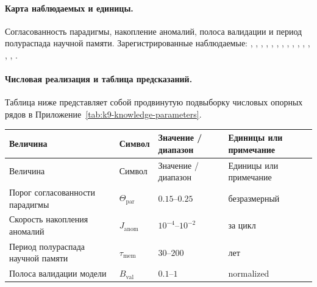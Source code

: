 \paragraph{Карта наблюдаемых и единицы.}
Согласованность парадигмы, накопление аномалий, полоса валидации и период полураспада научной памяти.
Зарегистрированные наблюдаемые: , \allowbreak {}, \allowbreak {}, \allowbreak {}, \allowbreak {}, \allowbreak {}, \allowbreak {}, \allowbreak {}, \allowbreak {}, \allowbreak {}, \allowbreak {}, \allowbreak {}, \allowbreak {}, \allowbreak {}, \allowbreak {}.

\paragraph{Числовая реализация и таблица предсказаний.}
Таблица ниже представляет собой продвинутую подвыборку числовых опорных рядов в Приложение~\ref{tab:k9-knowledge-parameters}.
\begin{longtable}{@{}L{0.27\textwidth}L{0.15\textwidth}L{0.24\textwidth}L{0.16\textwidth}@{}}
\toprule
Величина & Символ & Значение / диапазон & Единицы или примечание \\
\midrule
\endfirsthead
\toprule
Величина & Символ & Значение / диапазон & Единицы или примечание \\
\midrule
\endhead
Порог согласованности парадигмы & $\scriptstyle \Theta_{\mathrm{par}}$ & $0.15\text{--}0.25$ & безразмерный \\
Скорость накопления аномалий & $\scriptstyle J_{\mathrm{anom}}$ & $10^{-4}\text{--}10^{-2}$ & за цикл \\
Период полураспада научной памяти & $\scriptstyle \tau_{\mathrm{mem}}$ & $30\text{--}200$ & лет \\
Полоса валидации модели & $\scriptstyle B_{\mathrm{val}}$ & $0.1\text{--}1$ & normalized \\
\bottomrule
\end{longtable}

